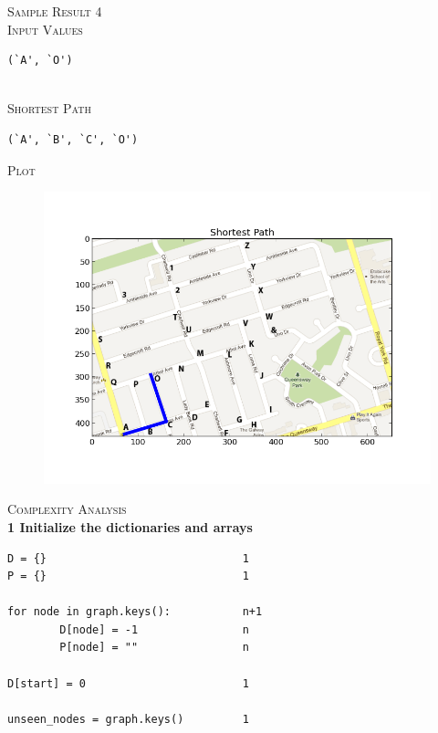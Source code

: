 \documentclass[pdftex,12pt,a4paper]{article}
\newcommand{\nspace}{\\[0.25cm]}
\begin{document}
\textsc{\large Sample Result 4} \hfill \nspace

\textsc{Input Values} \hfill \nspace

\begin{verbatim}
(`A', `O')
\end{verbatim}

\hfill \nspace
\textsc{Shortest Path} \hfill \nspace

\begin{verbatim}
(`A', `B', `C', `O')
\end{verbatim}

\newpage
\textsc{Plot} \hfill \nspace

\begin{figure}[h!]
  \centering
	\includegraphics[scale=0.60]{img/dijkstra_test_4.png}
\end{figure}





\textsc{\Large Complexity Analysis} \hfill \nspace

{\bf \large 1 Initialize the dictionaries and arrays}
\begin{verbatim}
D = {}                              1
P = {}                              1

for node in graph.keys():           n+1
        D[node] = -1                n
        P[node] = ""                n

D[start] = 0                        1

unseen_nodes = graph.keys()         1
\end{verbatim}
\end{document}
